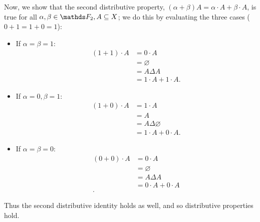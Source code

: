 \documentclass{homework}
\begin{document}
\begin{solution}
\begin{itemize}
    Now, we show that the second distributive property, $\left( \alpha+ \beta \right) A =
    \alpha\cdot A+\beta\cdot A$, is true for all $\alpha,\beta\in \F_2,A\subseteq X$; we do this by
    evaluating the three cases ($0+ 1=1+ 0=1$):
    \begin{itemize}
      \item If $\alpha=\beta=1$:
        \begin{align*}
          (1+ 1)\cdot A &= 0\cdot A \\
          &= \varnothing \\
          &= A\Delta A \\
          &= 1\cdot A+1\cdot A
        .\end{align*}
      \item If $\alpha=0,\beta=1$:
        \begin{align*}
          (1+0)\cdot A&= 1\cdot A \\
          &= A \\
          &= A\Delta\varnothing \\
          &= 1\cdot A+0\cdot A
        .\end{align*}
      \item If $\alpha=\beta=0$:
        \begin{align*}
          (0+0)\cdot A&= 0\cdot A \\
          &= \varnothing \\
          &= A\Delta A \\
          &= 0\cdot A+0\cdot A \\
        .\end{align*}
    \end{itemize}
    Thus the second distributive identity holds as well, and so distributive properties hold.

  \end{itemize}
\end{solution}
\end{document}
